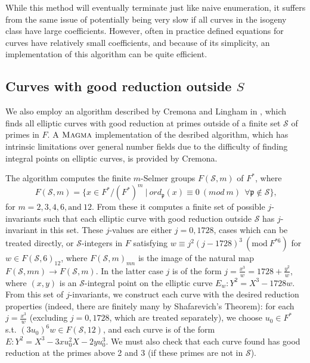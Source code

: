 \documentclass{amsart}
\begin{document}
While this method will eventually terminate just like naive
enumeration, it suffers from the same issue of potentially being very
slow if all curves in the isogeny class have large
coefficients. However, often in practice defined equations for curves
have relatively small coefficients, and because of its simplicity, an
implementation of this algorithm can be quite efficient. 


\subsection{Curves with good reduction outside $S$}

We also employ an algorithm described by Cremona and Lingham
in \cite{cremona-lingham}, which finds all elliptic curves with good
reduction at primes outside of a finite set $\mathcal{S}$ of primes in
$F$. A $\textsc{Magma}$ implementation of the desribed algorithm, which
has intrinsic limitations over general number fields due to the
difficulty of finding integral points on elliptic curves, is provided by
Cremona.

The algorithm computes the finite $m$-Selmer groups $F(\mathcal{S},m)$ of
$F^*$, where
\begin{equation*}
  F(\mathcal{S},m) = \{x\in F^*/(F^*)^m \ | \ ord_\mathfrak{p}(x) 
    \equiv 0 \ (mod \ m) \ \ \forall \mathfrak{p}\notin \mathcal{S}\}\text{,}
\end{equation*}
for $m = 2, 3, 4, 6, \text{and}\ 12$. From these it computes a finite set of
possible $j$-invariants such that each elliptic curve with good reduction
outside $\mathcal{S}$ has $j$-invariant in this set. These $j$-values are either
$j=0,1728$, cases which can be treated directly, or $\mathcal{S}$-integers in
$F$ satisfying $w \equiv j^2(j-1728)^3 \ (\text{mod} \ F^{*6})$ for
$w\in F(\mathcal{S},6)_{12}$, where $F(\mathcal{S},m)_{mn}$ is the image of the
natural map $F(\mathcal{S},mn) \rightarrow F(\mathcal{S},m)$. In the latter
case $j$ is of the form $j = \frac{x^3}{w} = 1728 + \frac{y^2}{w}$, where
$(x,y)$ is an $\mathcal{S}$-integral point on the elliptic curve
$E_w: Y^2 = X^3 - 1728w$. From this set of $j$-invariants, we construct each
curve with the desired reduction properties (indeed, there are finitely many
by Shafarevich's Theorem): for each $j = \frac{x^3}{w}$ (excluding
$j = 0, 1728$, which are treated separately), we choose $u_0 \in F^*$ s.t.
$(3u_0)^6w \in F(\mathcal{S},12)$, and each curve is of the form
$E: Y^2 = X^3 - 3xu_0^2X - 2yu_0^3$. We must also check that each curve
found has good reduction at the primes above 2 and 3 (if these primes
are not in $\mathcal{S}$).
\end{document}
